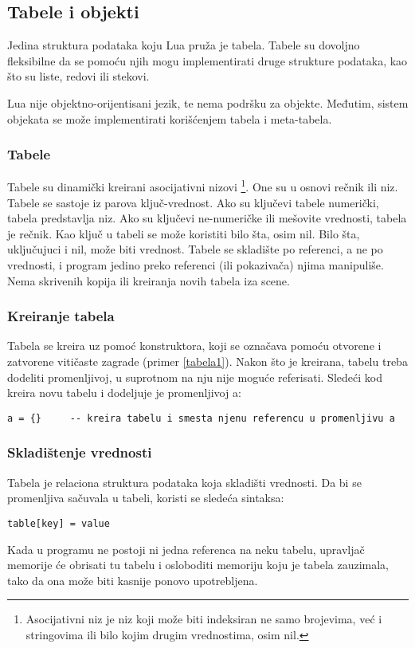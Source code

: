 \documentclass[a4paper]{article}
\begin{document}
\subsection*{Tabele i objekti}
Jedina struktura podataka koju Lua pruža je tabela. Tabele su dovoljno fleksibilne da se pomoću njih mogu implementirati druge strukture podataka, kao što su liste, redovi ili stekovi.

Lua nije objektno-orijentisani jezik, te nema podršku za objekte. Međutim, sistem objekata se može implementirati korišćenjem tabela i meta-tabela.

\subsubsection*{Tabele}
Tabele su dinamički kreirani asocijativni nizovi \footnote{Asocijativni niz je niz koji može biti indeksiran ne samo brojevima, već i stringovima ili bilo kojim drugim vrednostima, osim nil.}. One su u osnovi rečnik ili niz. Tabele se sastoje iz parova ključ-vrednost. Ako su ključevi tabele numerički, tabela predstavlja niz. Ako su ključevi ne-numeričke ili mešovite vrednosti, tabela je rečnik. Kao ključ u tabeli se može koristiti bilo šta, osim nil. Bilo šta, uključujuci i nil, može biti vrednost.
Tabele se skladište po referenci, a ne po vrednosti, i program jedino preko referenci (ili pokazivača) njima manipuliše. Nema skrivenih kopija ili kreiranja novih tabela iza scene.

\subsubsection*{Kreiranje tabela}
Tabela se kreira uz pomoć konstruktora, koji se označava pomoću otvorene i zatvorene vitičaste zagrade (primer \ref{tabela1}). Nakon što je kreirana, tabelu treba dodeliti promenljivoj, u suprotnom na nju nije moguće referisati. Sledeći kod kreira novu tabelu i dodeljuje je promenljivoj a:
\begin{lstlisting}[caption={Kreiranje nove tabele i smeštanje u promenljivu},frame=single, label=tabela1]
a = {}     -- kreira tabelu i smesta njenu referencu u promenljivu a
\end{lstlisting}

\subsubsection*{Skladištenje vrednosti}
Tabela je relaciona struktura podataka koja skladišti vrednosti. Da bi se promenljiva sačuvala u tabeli, koristi se sledeća sintaksa:
\begin{lstlisting}[caption={Čuvanje vrednosti \textit{value} u tabeli},frame=single, label=tabela1]
table[key] = value
\end{lstlisting}
Kada u programu ne postoji ni jedna referenca na neku tabelu, upravljač memorije će obrisati tu tabelu i osloboditi memoriju koju je tabela zauzimala, tako da ona može biti kasnije ponovo upotrebljena.
\end{document}
